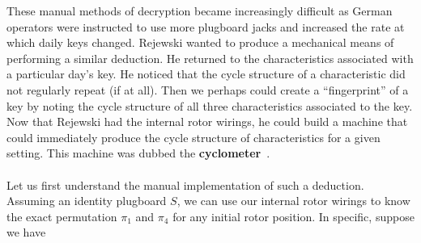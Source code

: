 These manual methods of decryption became increasingly difficult as
German operators were instructed to use more plugboard jacks and
increased the rate at which daily keys changed. Rejewski wanted to
produce a mechanical means of performing a similar deduction. He
returned to the characteristics associated with a particular day's
key. He noticed that the cycle structure of a characteristic did not
regularly repeat (if at all). Then we perhaps could create a
``fingerprint'' of a key by noting the cycle structure of all three
characteristics associated to the key. Now that Rejewski had the
internal rotor wirings, he could build a machine that could
immediately produce the cycle structure of characteristics for a given setting. This machine was dubbed the {\bf{cyclometer}}~\cite[pp.~224--225]{Rejewski1981}.
\\\\Let us first understand the manual implementation of such a
deduction. Assuming an identity plugboard $S$, we can use our internal
rotor wirings to know the exact permutation $\pi_1$ and
$\pi_4$ for any initial rotor position. In specific, suppose we have

